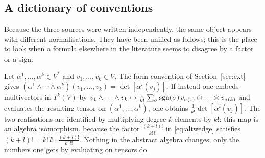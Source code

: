 \subsection{A dictionary of conventions}\label{sec:conventions}

Because the three sources were written independently, the same object appears with different normalisations. They have been unified
as follows; this is the place to look when a formula elsewhere in the literature seems to disagree by a factor or a sign.

\begin{remark}\label{rem:kfactorial}
Let $\alpha^1,\dots,\alpha^k\in V^*$ and $v_1,\dots,v_k\in V$. The form convention of Section~\ref{sec:ext} gives $(\alpha^1\wedge\cdots\wedge\alpha^k)(v_1,\dots,v_k)=\det[\alpha^i(v_j)]$. If instead one embeds multivectors in $T^k(V)$ by
$v_1\wedge\cdots\wedge v_k\mapsto\frac1{k!}\sum_\sigma\mathrm{sgn}(\sigma)\,v_{\sigma(1)}\otimes\cdots\otimes v_{\sigma(k)}$ and evaluates the resulting tensor on $(\alpha^1,\dots,\alpha^k)$, one obtains $\frac1{k!}\det[\alpha^i(v_j)]$. The two realisations are identified by multiplying degree-$k$ elements by $k!$: this map is an algebra isomorphism, because the factor $\frac{(k+l)!}{k!\,l!}$ in \eqref{eq:altwedge} satisfies $(k+l)!=k!\,l!\cdot\frac{(k+l)!}{k!\,l!}$. Nothing in the abstract algebra changes; only the numbers one gets by evaluating on tensors do.
\end{remark}

